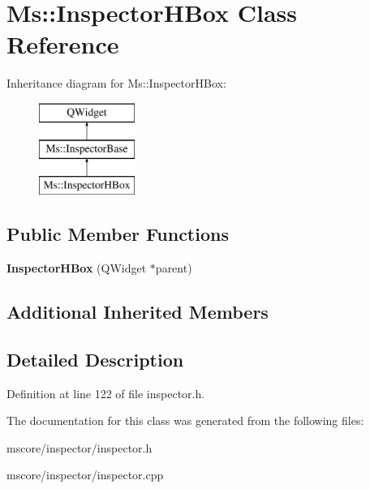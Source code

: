 \hypertarget{class_ms_1_1_inspector_h_box}{}\section{Ms\+:\+:Inspector\+H\+Box Class Reference}
\label{class_ms_1_1_inspector_h_box}
Inheritance diagram for Ms\+:\+:Inspector\+H\+Box\+:\begin{figure}[H]
\begin{center}
\leavevmode
\includegraphics[height=3.000000cm]{class_ms_1_1_inspector_h_box}
\end{center}
\end{figure}
\subsection*{Public Member Functions}
\begin{DoxyCompactItemize}
\item 
\mbox{\label{class_ms_1_1_inspector_h_box_aefe3dd983b81b1893d0981c22ca962d0}} 
{\bfseries Inspector\+H\+Box} (Q\+Widget $\ast$parent)
\end{DoxyCompactItemize}
\subsection*{Additional Inherited Members}


\subsection{Detailed Description}


Definition at line 122 of file inspector.\+h.



The documentation for this class was generated from the following files\+:\begin{DoxyCompactItemize}
\item 
mscore/inspector/inspector.\+h\item 
mscore/inspector/inspector.\+cpp\end{DoxyCompactItemize}
